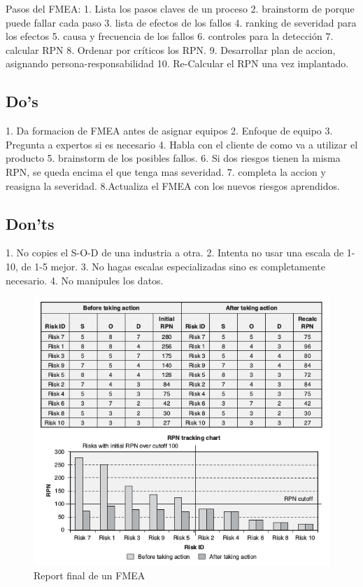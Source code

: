\documentclass[]{article}
\begin{document}
Pasos del FMEA: 1. Lista los pasos claves de un proceso 2. brainstorm de porque puede fallar cada paso 3. lista de efectos de los fallos 4. ranking de severidad para los efectos 5. causa y frecuencia de los fallos 6. controles para la detección 7. calcular RPN 8. Ordenar por críticos los RPN. 9. Desarrollar plan de accion, asignando persona-responsabilidad 10. Re-Calcular el RPN una vez implantado.

\subsection{Do's} 1. Da formacion de FMEA antes de asignar equipos 2. Enfoque de equipo 3. Pregunta a expertos si es necesario 4. Habla con el cliente de como va a utilizar el producto 5. brainstorm de los posibles fallos. 6. Si dos riesgos tienen la misma RPN, se queda encima el que tenga mas severidad. 7. completa la accion y reasigna la severidad. 8.Actualiza el FMEA con los nuevos riesgos aprendidos.

\subsection{Don'ts} 1. No copies el S-O-D de una industria a otra. 2. Intenta no usar una escala de 1-10, de 1-5 mejor. 3. No hagas escalas especializadas sino es completamente necesario. 4.	No manipules los datos.

\begin{figure}[ht!]
	\centering
	\includegraphics[width=140mm]{imagenes/FMEAPrePos.png}
	\caption{Report final de un FMEA}
	\label{fig:FMEAPrePos}
\end{figure}
\end{document}
